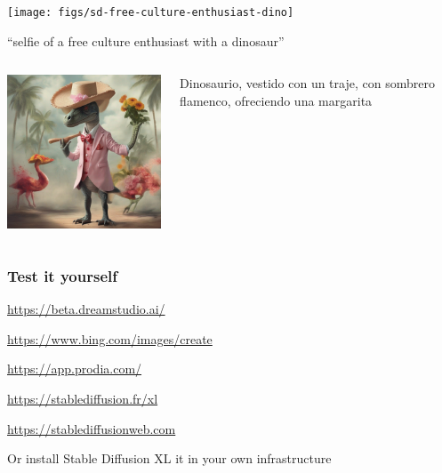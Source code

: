 \documentclass[17pt,aspectratio=169,hyperref={pdfusetitle,colorlinks,allcolors=olive}]{beamer}
\begin{document}
\begin{frame}[fragile]

  \texttt{[image: figs/sd-free-culture-enthusiast-dino]}

  {\small
  ``selfie of a free culture enthusiast with a dinosaur''
}  
\end{frame}

\begin{frame}[fragile]

    \begin{columns}[T]
    \begin{column}{.58\textwidth}
        \includegraphics[width=7.5cm]{figs/sdxl-dinosaurio}
    \end{column}%
    \hfill%
    \begin{column}{.38\textwidth}
      Dinosaurio, vestido con un traje,  con sombrero flamenco, ofreciendo una margarita
    \end{column}%
  \end{columns}

\end{frame}


\begin{frame}[fragile]
  \frametitle{Test it yourself}

  \url{https://beta.dreamstudio.ai/}

  \url{https://www.bing.com/images/create}

  \url{https://app.prodia.com/}

  \url{https://stablediffusion.fr/xl}

  \url{https://stablediffusionweb.com}

  Or install Stable Diffusion XL it in your own infrastructure
\end{frame}
\end{document}
